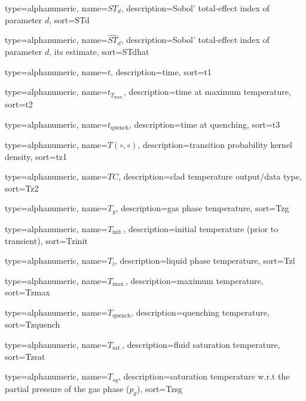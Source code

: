 {
  type=alphanumeric,
	name={\ensuremath{ST_d}},
	description={Sobol' total-effect index of parameter $d$},
	sort={STd}
}

{
  type=alphanumeric,
	name={\ensuremath{\widehat{ST}_d}},
	description={Sobol' total-effect index of parameter $d$, its estimate},
	sort={STdhat}
}

{
  type=alphanumeric,
	name={\ensuremath{t}},
	description={time},
	sort={t1}
}

{
  type=alphanumeric,
	name={\ensuremath{t_{T_\text{max.}}}},
	description={time at maximum temperature},
	sort={t2}
}

{
  type=alphanumeric,
	name={\ensuremath{t_\text{quench}}},
	description={time at quenching},
	sort={t3}
}

{
  type=alphanumeric,
	name={\ensuremath{T (\circ, \circ)}},
	description={transition probability kernel density},
	sort={tz1}
}

{
  type=alphanumeric,
	name={\ensuremath{TC}},
	description={clad temperature output/data type},
	sort={Tz2}
}

{
  type=alphanumeric,
	name={\ensuremath{T_{g}}},
	description={gas phase temperature},
	sort={Tzg}
}

{
  type=alphanumeric,
	name={\ensuremath{T_{\text{init.}}}},
	description={initial temperature (prior to transient)},
	sort={Tzinit}
}

{
  type=alphanumeric,
	name={\ensuremath{T_{l}}},
	description={liquid phase temperature},
	sort={Tzl}
}

{
  type=alphanumeric,
	name={\ensuremath{T_{\text{max.}}}},
	description={maximum temperature},
	sort={Tzmax}
}

{
  type=alphanumeric,
	name={\ensuremath{T_{\text{quench}}}},
	description={quenching temperature},
	sort={Tzquench}
}

{
  type=alphanumeric,
	name={\ensuremath{T_{\text{sat.}}}},
	description={fluid saturation temperature},
	sort={Tzsat}
}

{
  type=alphanumeric,
	name={\ensuremath{T_{sg}}},
	description={saturation temperature w.r.t the partial pressure of the gas phase ($p_g$)},
	sort={Tzsg}
}

